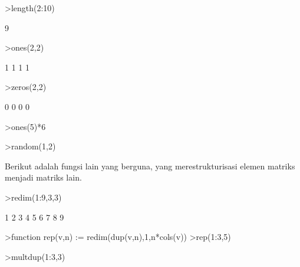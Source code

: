 \documentclass[a4paper,10pt]{article}
\begin{document}
\begin{eulernotebook}
\begin{eulercomment}
\begin{eulercomment}
\begin{eulercomment}
\begin{eulercomment}
\begin{eulerprompt}
>length(2:10)
\end{eulerprompt}
\begin{euleroutput}
  9
\end{euleroutput}
\begin{eulerprompt}
>ones(2,2)
\end{eulerprompt}
\begin{euleroutput}
              1             1 
              1             1 
\end{euleroutput}
\begin{eulerprompt}
>zeros(2,2)
\end{eulerprompt}
\begin{euleroutput}
              0             0 
              0             0 
\end{euleroutput}
\begin{eulerprompt}
>ones(5)*6
\end{eulerprompt}
\begin{euleroutput}
  [6,  6,  6,  6,  6]
\end{euleroutput}
\begin{eulerprompt}
>random(1,2)
\end{eulerprompt}
\begin{euleroutput}
  [0.0728753,  0.988966]
\end{euleroutput}
\begin{eulercomment}
Berikut adalah fungsi lain yang berguna, yang merestrukturisasi elemen
matriks menjadi matriks lain.
\end{eulercomment}
\begin{eulerprompt}
>redim(1:9,3,3)
\end{eulerprompt}
\begin{euleroutput}
              1             2             3 
              4             5             6 
              7             8             9 
\end{euleroutput}
\begin{eulerprompt}
>function rep(v,n) := redim(dup(v,n),1,n*cols(v))
>rep(1:3,5)
\end{eulerprompt}
\begin{euleroutput}
  [1,  2,  3,  1,  2,  3,  1,  2,  3,  1,  2,  3,  1,  2,  3]
\end{euleroutput}
\begin{eulerprompt}
>multdup(1:3,3)
\end{eulerprompt}
\begin{euleroutput}
  [1,  1,  1,  2,  2,  2,  3,  3,  3]

\end{euleroutput}
\end{eulercomment}
\end{eulercomment}
\end{eulercomment}
\end{eulercomment}
\end{eulernotebook}
\end{document}
